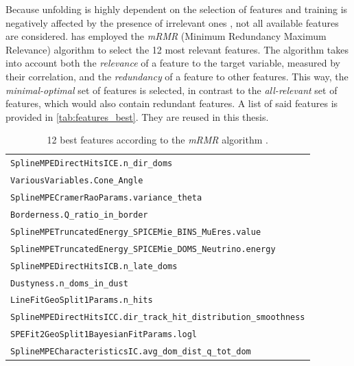 Because
  unfolding is highly dependent on the selection of features \cite{dsea_jan} %
  and training is negatively affected by the presence of irrelevant ones \cite{dash1997},
not all available features are considered.
%
\citeauthor{dsea_jan} \cite{dsea_jan} has employed the \emph{mRMR} (Minimum Redundancy Maximum Relevance) algorithm \cite{mrmr}
to select the 12 most relevant features.
The algorithm takes into account both
  the \emph{relevance} of a feature to the target variable,
    measured by their correlation,
  and the \emph{redundancy} of a feature to other features.
This way,
the \emph{minimal-optimal} set of features is selected,
  in contrast to the \emph{all-relevant} set of features,
    which would also contain redundant features. %
A list of said features is provided in \autoref{tab:features_best}.
They are reused in this thesis.

\begin{table}
  \centering
  \begin{tabular}{l}
    \toprule
    \texttt{SplineMPEDirectHitsICE.n\_dir\_doms} \\
    \texttt{VariousVariables.Cone\_Angle} \\
    \texttt{SplineMPECramerRaoParams.variance\_theta} \\
    \texttt{Borderness.Q\_ratio\_in\_border} \\
    \texttt{SplineMPETruncatedEnergy\_SPICEMie\_BINS\_MuEres.value} \\
    \texttt{SplineMPETruncatedEnergy\_SPICEMie\_DOMS\_Neutrino.energy} \\
    \texttt{SplineMPEDirectHitsICB.n\_late\_doms} \\
    \texttt{Dustyness.n\_doms\_in\_dust} \\
    \texttt{LineFitGeoSplit1Params.n\_hits} \\
    \texttt{SplineMPEDirectHitsICC.dir\_track\_hit\_distribution\_smoothness} \\
    \texttt{SPEFit2GeoSplit1BayesianFitParams.logl} \\
    \texttt{SplineMPECharacteristicsIC.avg\_dom\_dist\_q\_tot\_dom} \\
    \bottomrule
  \end{tabular}
  \caption{
    12 best features according to the \emph{mRMR} algorithm \cite{dsea_jan}.
  }
  \label{tab:features_best}
\end{table}


